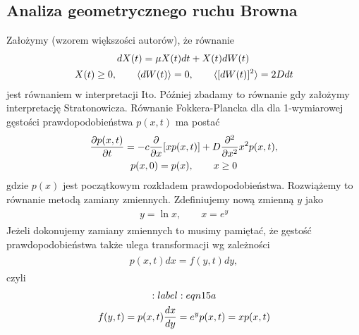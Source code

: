 \documentclass[a4paper,12pt,polish]{sphinxmanual}
\begin{document}
\subsection{Analiza geometrycznego ruchu Browna}
\label{ch3/chIII033:analiza-geometrycznego-ruchu-browna}
Założymy (wzorem większości autorów), że równanie
\label{ch3/chIII033:equation-eqn12}\begin{gather}
\begin{split}dX(t) = \mu X(t) dt + X(t) d W(t)\,\end{split}\label{ch3/chIII033-eqn12}\\\begin{split}X(t) \ge 0, \qquad \langle dW(t) \rangle = 0, \qquad \langle[dW(t)]^2 \rangle = 2D dt\end{split}\notag
\end{gather}
jest równaniem w interpretacji Ito. Później zbadamy to równanie gdy założymy interpretację Stratonowicza. Równanie Fokkera-Plancka dla dla 1-wymiarowej gęstości prawdopodobieństwa $p(x, t)$ ma postać
\label{ch3/chIII033:equation-eqn13}\begin{gather}
\begin{split}\frac{\partial p(x, t)}{\partial t} = - c \frac{\partial}{\partial x} [x p(x, t)] + D \frac{\partial^2}{\partial x^2} x^2 p(x, t),\end{split}\label{ch3/chIII033-eqn13}\\\begin{split}p(x, 0) =p(x), \qquad x \ge 0\end{split}\notag
\end{gather}
gdzie $p(x)$ jest początkowym rozkładem prawdopodobieństwa. Rozwiążemy to równanie metodą zamiany zmiennych. Zdefiniujemy nową zmienną $y$ jako
\label{ch3/chIII033:equation-eqn14}\begin{gather}
\begin{split}y=\ln x, \qquad x = e^y\end{split}\label{ch3/chIII033-eqn14}
\end{gather}
Jeżeli dokonujemy zamiany zmiennych to musimy pamiętać, że gęstość prawdopodobieństwa także ulega transformacji wg zależności
\label{ch3/chIII033:equation-eqn15}\begin{gather}
\begin{split}p(x, t) dx = f(y, t) dy,\end{split}\label{ch3/chIII033-eqn15}
\end{gather}
czyli
\begin{gather}
\begin{split}:label:eqn15a\end{split}\notag\\\begin{split}f(y, t) = p(x, t) \frac{dx}{dy} = e^y p(x, t) = x p(x, t)\end{split}\notag
\end{gather}
\end{document}
